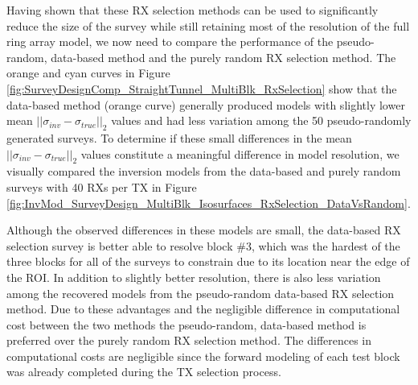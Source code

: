 \documentclass[preprint,authoryear,12pt]{elsarticle}
\begin{document}
Having shown that these RX selection methods can be used to significantly reduce the size of the survey while still retaining most of the resolution of the full ring array model, we now need to compare the performance of the pseudo-random, data-based method and the purely random RX selection method. The orange and cyan curves in Figure \ref{fig:SurveyDesignComp_StraightTunnel_MultiBlk_RxSelection} show that the data-based method (orange curve) generally produced models with slightly lower mean $\left|| \sigma_{inv} - \sigma_{true} \right||_2$ values and had less variation among the 50 pseudo-randomly generated surveys. To determine if these small differences in the mean $\left|| \sigma_{inv} - \sigma_{true} \right||_2$ values constitute a meaningful difference in model resolution, we visually compared the inversion models from the data-based and purely random surveys with 40 RXs per TX in Figure \ref{fig:InvMod_SurveyDesign_MultiBlk_Isosurfaces_RxSelection_DataVsRandom}.

Although the observed differences in these models are small, the data-based RX selection survey is better able to resolve block \#3, which was the hardest of the three blocks for all of the surveys to constrain due to its location near the edge of the ROI. In addition to slightly better resolution, there is also less variation among the recovered models from the pseudo-random data-based RX selection method. Due to these advantages and the negligible difference in computational cost between the two methods the pseudo-random, data-based method is preferred over the purely random RX selection method. The differences in computational costs are negligible since the forward modeling of each test block was already completed during the TX selection process.
\end{document}
